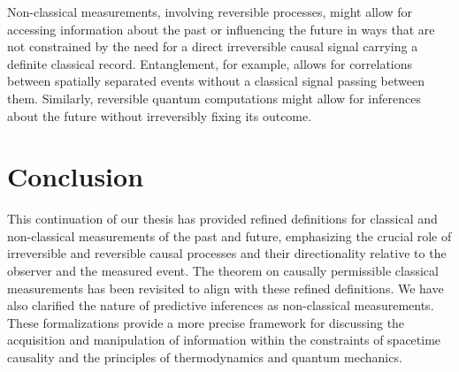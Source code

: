 	\begin{observation}
		Non-classical measurements, involving reversible processes, might allow for accessing information about the past or influencing the future in ways that are not constrained by the need for a direct irreversible causal signal carrying a definite classical record. Entanglement, for example, allows for correlations between spatially separated events without a classical signal passing between them. Similarly, reversible quantum computations might allow for inferences about the future without irreversibly fixing its outcome.
	\end{observation}
	
	\section{Conclusion}
	
	This continuation of our thesis has provided refined definitions for classical and non-classical measurements of the past and future, emphasizing the crucial role of irreversible and reversible causal processes and their directionality relative to the observer and the measured event. The theorem on causally permissible classical measurements has been revisited to align with these refined definitions. We have also clarified the nature of predictive inferences as non-classical measurements. These formalizations provide a more precise framework for discussing the acquisition and manipulation of information within the constraints of spacetime causality and the principles of thermodynamics and quantum mechanics.
	
